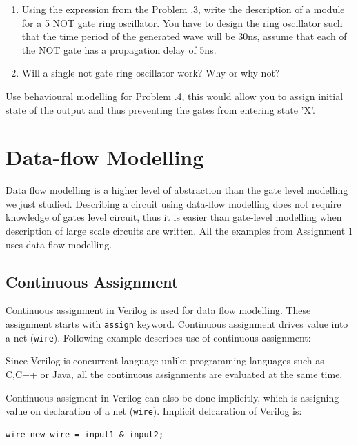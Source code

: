\documentclass[a4paper,10pt]{article}
\theoremstyle{mytheor}
\newcommand{
  \insertverilog}[3]{
  
}
\newcounter{problemNumber}
\newcounter{pitfallCount} %
\newcommand{\pitfallcounter}[1]{%
  \refstepcounter{pitfallCount}%
  \thepitfallCount%
  \label{#1}}%
\newcommand{\pitfall}[2] {
  \begin{tcolorbox}[arc=0pt,colback=yellow!10!white,colframe=orange!75!black,title=\textbf{Common Pitfall - \pitfallcounter{#1}}]
    #2
  \end{tcolorbox}
}
\newcounter{hintCount} %
\newcommand{\hintcounter}[1]{%
  \refstepcounter{hintCount}%
  \thehintCount%
  \label{#1}}%
\newcounter{hintcnt}
\newcommand{\hint}[2] {
  \begin{tcolorbox}[colback=blue!5!white,colframe=blue!75!black,title=\textbf{Hint - \hintcounter{#1}}]  
    #2
  \end{tcolorbox}
  \addtocounter{hintcnt}{1}
}
\newcommand{\inlinev}[1]{\lstinline[style=verilog-inline-style]{#1}}
\begin{document}
{\begin {enumerate}
  \item Using the expression from the Problem {\theproblemNumber}.3,
    write the description of a module for a 5 NOT gate ring
    oscillator. You have to design the ring oscillator such that the
    time period of the generated wave will be 30ns, assume that each
    of the NOT gate has a propagation delay of 5ns.
  \item Will a single not gate ring oscillator work? Why or why not?
  \end{enumerate}

  \hint{hint:problem-1}{Use behavioural modelling for Problem \theproblemNumber.4,
    this would allow you to assign initial state of the output and
    thus preventing the gates from entering state 'X'.}  }


\section{Data-flow Modelling}
Data flow modelling is a higher level of abstraction than the gate
level modelling we just studied. Describing a circuit using data-flow
modelling does not require knowledge of gates level circuit, thus it
is easier than gate-level modelling when description of large scale
circuits are written.  All the examples from Assignment 1 uses data
flow modelling.

\subsection{Continuous Assignment}
\label{continuous-assignment}
Continuous assignment in Verilog is used for data flow modelling.
These assignment starts with
\inlinev{assign} keyword. Continuous
assignment drives value into a net
(\inlinev{wire}). Following example
describes use of continuous assignment:

\pitfall{pitfall:verilog-concurrency}{Since Verilog is concurrent language unlike programming
  languages such as C,C++ or Java, all the continuous assignments are
  evaluated at the same time.}

\insertverilog{./verilog_files/continuousAssignment.v}{continuous-assignment}{Example
  usage of continuous assignment.}

Continuous assigment in Verilog can also be done implicitly, which is
assigning value on declaration of a net
(\inlinev{wire}). Implicit delcaration
of Verilog is:
\begin{lstlisting}[style=verilog-inline-style,xleftmargin=.25\textwidth]
  wire new_wire = input1 & input2;
\end{lstlisting}
\end{document}
